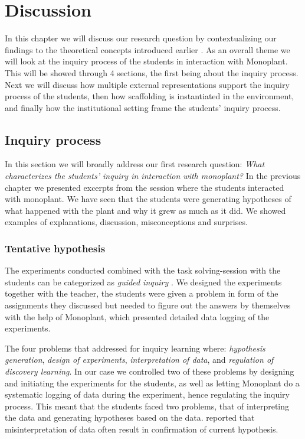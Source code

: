 \chapter{Discussion}
In this chapter we will discuss our research question by contextualizing our findings to the theoretical concepts introduced earlier . As an overall theme we will look at the inquiry process of the students in interaction with Monoplant. This will be showed through 4 sections, the first being about the inquiry process. Next we will discuss how multiple external representations support the inquiry process of the students, then how scaffolding is instantiated in the environment, and finally how the institutional setting frame the students' inquiry process.

\section{Inquiry process}
In this section we will broadly address our first research question: \emph{What characterizes the students’ inquiry in interaction with monoplant?}
In the previous chapter we presented excerpts from the session where the students interacted with monoplant. We have seen that the students were generating hypotheses of what happened with the plant and why it grew as much as it did. We showed examples of explanations, discussion, misconceptions and surprises.

\subsection{Tentative hypothesis}
The experiments conducted combined with the task solving-session with the students can be categorized as \emph{guided inquiry} \citeauthor*{staver1987analysis} \citetext{\citeyear{staver1987analysis}, referenced in \citealp{prince2006inductive}}. We designed the experiments together with the teacher, the students were given a problem in form of the assignments they discussed but needed to figure out the answers by themselves with the help of Monoplant, which presented detailed data logging of the experiments.

The four problems that \citet{de1998scientific} addressed for inquiry learning where: \textit{hypothesis generation}, \textit{design of experiments}, \textit{interpretation of data}, and \textit{regulation of discovery learning}. In our case we controlled two of these problems by designing and initiating the experiments for the students, as well as letting Monoplant do a systematic logging of data during the experiment, hence regulating the inquiry process. This meant that the students faced two problems, that of interpreting the data and generating hypotheses based on the data. \citeauthor*{klahr1993heuristics} \citetext{\citeyear{klahr1993heuristics}, referenced in \citealp{de1998scientific}} reported that misinterpretation of data often result in confirmation of current hypothesis. 

